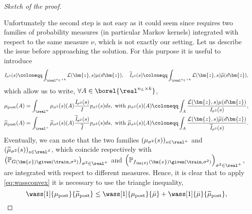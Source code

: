 \begin{proof}[Sketch of the proof]
\begin{enumerate}
\begin{proposition}
        \end{proposition}
    \end{enumerate}
    Unfortunately the second step is not easy as it could seem since  requires two families of probability measures (in particular Markov kernels) integrated with respect to the same measure $\nu$, which is not exactly our setting. 
    Let us describe the issue before approaching the solution. For this purpose it is useful to introduce
    \begin{equation*}
        \begin{aligned}
            \mathit{I}_{\sigma^2}(s) \coloneqq \int_{\real^{n_L \times k}} \mathcal{L}(\bm{z}, s) \mu(d\bm{z}), \quad \widetilde{\mathit{I}}_{\sigma^2}(s) \coloneqq \int_{\real^{n_L \times k}} \mathcal{L}(\bm{z}, s) \widetilde{\mu}(d\bm{z}),
        \end{aligned}
    \end{equation*}
    which allow us to write, $\forall A \in \borel{\real^{n_L \times k}}$,
    \begin{equation} \label{eq:mupost}
        \begin{aligned}
            & \mu_{\mathrm{post}}(A) = \int_{\real^+} \mu_{\sigma^2}(s)(A) \frac{\mathit{I}_{\sigma^2}(s)}{\mathit{I}} p_{\sigma^2}(s) ds, \text{ with } \mu_{\sigma^2}(s)(A) \coloneqq \int_A \frac{\mathcal{L}(\bm{z}, s) \mu(d\bm{z})}{\mathit{I}_{\sigma^2}(s)}, \\
            & \widetilde{\mu}_{\mathrm{post}}(A) = \int_{\real^+} \widetilde{\mu}_{\sigma^2}(s)(A) \frac{\widetilde{\mathit{I}}_{\sigma^2}(s)}{\widetilde{\mathit{I}}} p_{\sigma^2}(s) ds, \text{ with } \widetilde{\mu}_{\sigma^2}(s)(A) \coloneqq \int_A \frac{\mathcal{L}(\bm{z}, s) \widetilde{\mu}(d\bm{z})}{\widetilde{\mathit{I}}_{\sigma^2}(s)}.
        \end{aligned}
    \end{equation}
    Eventually, we can note that the two families $(\mu_{\sigma^2}(s))_{s \in \real^+}$ and $(\widetilde{\mu}_{\sigma^2}(s))_{s \in \real^S}$, which coincide respectively with $\left(\mathbb{P}_{G(\bm{x}) \given (\train, \sigma^2)}\right)_{\sigma^2 \in \real^+}$ and $\left(\mathbb{P}_{f_{\bm{\theta}}(\bm{x}) \given (\train, \sigma^2)}\right)_{\sigma^2 \in \real^+}$, are integrated with respect to different measures.
    Hence, it is clear that to apply \cref{eq:wassconvex} it is necessary to use the triangle inequality,
    \begin{equation} \label{eq:trianstep}
        \wass[1]{\mu_{\mathrm{post}}}{\widetilde{\mu}_{\mathrm{post}}} \leq \wass[1]{\mu_{\mathrm{post}}}{\bar{\mu}} + \wass[1]{\bar{\mu}}{\widetilde{\mu}_{\mathrm{post}}},

\end{equation}
\end{proof}
